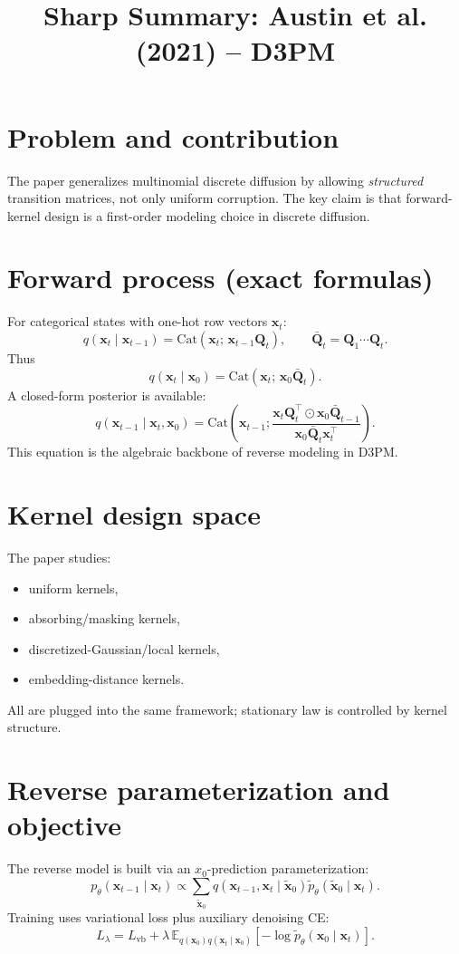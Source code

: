 \documentclass[11pt]{article}
\title{Sharp Summary: Austin et al. (2021) -- D3PM}
\author{}
\date{}
\begin{document}
\maketitle

\section*{Problem and contribution}
The paper generalizes multinomial discrete diffusion by allowing \emph{structured} transition matrices, not only uniform corruption. The key claim is that forward-kernel design is a first-order modeling choice in discrete diffusion.

\section*{Forward process (exact formulas)}
For categorical states with one-hot row vectors $\mathbf x_t$:
\[
q(\mathbf x_t\mid \mathbf x_{t-1}) = \mathrm{Cat}(\mathbf x_t;\, \mathbf x_{t-1}\mathbf Q_t),
\qquad
\bar{\mathbf Q}_t = \mathbf Q_1\cdots \mathbf Q_t.
\]
Thus
\[
q(\mathbf x_t\mid \mathbf x_0)=\mathrm{Cat}(\mathbf x_t;\,\mathbf x_0\bar{\mathbf Q}_t).
\]
A closed-form posterior is available:
\[
q(\mathbf x_{t-1}\mid \mathbf x_t,\mathbf x_0)
=\mathrm{Cat}\!\left(
\mathbf x_{t-1};
\frac{\mathbf x_t\mathbf Q_t^{\top}\odot \mathbf x_0\bar{\mathbf Q}_{t-1}}
{\mathbf x_0\bar{\mathbf Q}_t\mathbf x_t^{\top}}
\right).
\]
This equation is the algebraic backbone of reverse modeling in D3PM.

\section*{Kernel design space}
The paper studies:
\begin{itemize}
\item uniform kernels,
\item absorbing/masking kernels,
\item discretized-Gaussian/local kernels,
\item embedding-distance kernels.
\end{itemize}
All are plugged into the same framework; stationary law is controlled by kernel structure.

\section*{Reverse parameterization and objective}
The reverse model is built via an $x_0$-prediction parameterization:
\[
p_\theta(\mathbf x_{t-1}\mid \mathbf x_t)
\propto
\sum_{\tilde{\mathbf x}_0}
q(\mathbf x_{t-1},\mathbf x_t\mid \tilde{\mathbf x}_0)
\tilde p_\theta(\tilde{\mathbf x}_0\mid \mathbf x_t).
\]
Training uses variational loss plus auxiliary denoising CE:
\[
L_\lambda = L_{\mathrm{vb}} + \lambda\,\mathbb E_{q(\mathbf x_0)q(\mathbf x_t\mid \mathbf x_0)}[-\log \tilde p_\theta(\mathbf x_0\mid \mathbf x_t)].
\]
\end{document}
